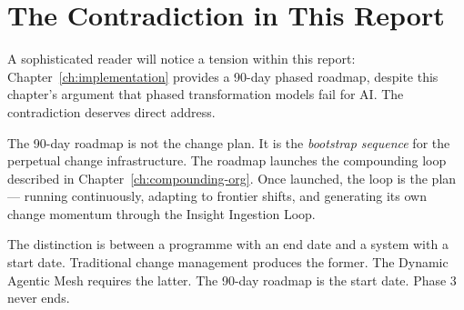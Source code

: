 \section{The Contradiction in This Report}

A sophisticated reader will notice a tension within this report: Chapter~\ref{ch:implementation} provides a 90-day phased roadmap, despite this chapter's argument that phased transformation models fail for AI. The contradiction deserves direct address.

The 90-day roadmap is not the change plan. It is the \emph{bootstrap sequence} for the perpetual change infrastructure. The roadmap launches the compounding loop described in Chapter~\ref{ch:compounding-org}. Once launched, the loop is the plan --- running continuously, adapting to frontier shifts, and generating its own change momentum through the Insight Ingestion Loop.

The distinction is between a programme with an end date and a system with a start date. Traditional change management produces the former. The Dynamic Agentic Mesh requires the latter. The 90-day roadmap is the start date. Phase 3 never ends.
